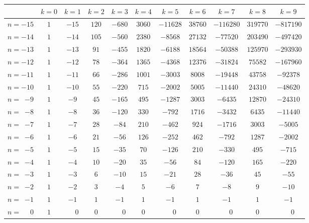 \vspace{3em}\noindent
\begin{tabular}[t]{l|cccccccccc}
\toprule
& $k=0$ & $k=1$ & $k=2$ & $k=3$ & $k=4$ & $k=5$ & $k=6$ & $k=7$ & $k=8$ & $k=9$\\
\midrule%
$n=-15$ & $1$ & $-15$ & $120$ & $-680$ & $3060$ & $-11628$ & $38760$ & $-116280$ & $319770$ & $-817190$\\
$n=-14$ & $1$ & $-14$ & $105$ & $-560$ & $2380$ & $-8568$ & $27132$ & $-77520$ & $203490$ & $-497420$\\
$n=-13$ & $1$ & $-13$ & $91$ & $-455$ & $1820$ & $-6188$ & $18564$ & $-50388$ & $125970$ & $-293930$\\
$n=-12$ & $1$ & $-12$ & $78$ & $-364$ & $1365$ & $-4368$ & $12376$ & $-31824$ & $75582$ & $-167960$\\
\midrule%
$n=-11$ & $1$ & $-11$ & $66$ & $-286$ & $1001$ & $-3003$ & $8008$ & $-19448$ & $43758$ & $-92378$\\
$n=-10$ & $1$ & $-10$ & $55$ & $-220$ & $715$ & $-2002$ & $5005$ & $-11440$ & $24310$ & $-48620$\\
$n=\phantom{1}{-9}$ & $1$ & $-9$ & $45$ & $-165$ & $495$ & $-1287$ & $3003$ & $-6435$ & $12870$ & $-24310$\\
$n=\phantom{1}{-8}$ & $1$ & $-8$ & $36$ & $-120$ & $330$ & $-792$ & $1716$ & $-3432$ & $6435$ & $-11440$\\
\midrule%
$n=\phantom{1}{-7}$ & $1$ & $-7$ & $28$ & $-84$ & $210$ & $-462$ & $924$ & $-1716$ & $3003$ & $-5005$\\
$n=\phantom{1}{-6}$ & $1$ & $-6$ & $21$ & $-56$ & $126$ & $-252$ & $462$ & $-792$ & $1287$ & $-2002$\\
$n=\phantom{1}{-5}$ & $1$ & $-5$ & $15$ & $-35$ & $70$ & $-126$ & $210$ & $-330$ & $495$ & $-715$\\
$n=\phantom{1}{-4}$ & $1$ & $-4$ & $10$ & $-20$ & $35$ & $-56$ & $84$ & $-120$ & $165$ & $-220$\\
\midrule%
$n=\phantom{1}{-3}$ & $1$ & $-3$ & $6$ & $-10$ & $15$ & $-21$ & $28$ & $-36$ & $45$ & $-55$\\
$n=\phantom{1}{-2}$ & $1$ & $-2$ & $3$ & $-4$ & $5$ & $-6$ & $7$ & $-8$ & $9$ & $-10$\\
$n=\phantom{1}{-1}$ & $1$ & $-1$ & $1$ & $-1$ & $1$ & $-1$ & $1$ & $-1$ & $1$ & $-1$\\
$n=\phantom{-1}0$ & $1$ & $\phantom{-}0$ & $0$ & $\phantom{-}0$ & $0$
 & $\phantom{-}0$ & $0$ & $\phantom{-}0$ & $0$ & $\phantom{-}0$\\
\bottomrule
\end{tabular}

